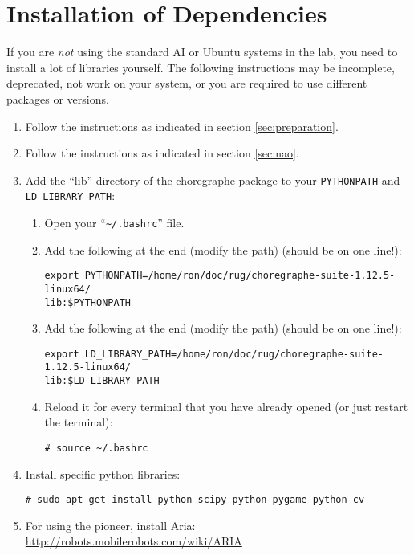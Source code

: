 \documentclass[a4paper, 10pt]{article}
\begin{document}
\section{Installation of Dependencies}

If you are \textit{not} using the standard AI or Ubuntu systems in the lab, you need to install a lot of libraries yourself.
The following instructions may be incomplete, deprecated, not work on your system, or you are required to use different packages or versions.

\begin{enumerate}
    \item Follow the instructions as indicated in section \ref{sec:preparation}.
    \item Follow the instructions as indicated in section \ref{sec:nao}.
    \item Add the ``lib'' directory of the choregraphe package to your \lstinline{PYTHONPATH} and \lstinline{LD_LIBRARY_PATH}:
    \begin{enumerate}
        \item Open your ``\lstinline{~/.bashrc}'' file.
        \item Add the following at the end (modify the path) (should be on one line!):
\begin{lstlisting}
export PYTHONPATH=/home/ron/doc/rug/choregraphe-suite-1.12.5-linux64/
lib:$PYTHONPATH
\end{lstlisting}
        \item Add the following at the end (modify the path) (should be on one line!):
\begin{lstlisting}
export LD_LIBRARY_PATH=/home/ron/doc/rug/choregraphe-suite-1.12.5-linux64/
lib:$LD_LIBRARY_PATH
\end{lstlisting}
        \item Reload it for every terminal that you have already opened (or just restart the terminal):
\begin{lstlisting}
# source ~/.bashrc
\end{lstlisting}
    \end{enumerate}
    \item Install specific python libraries:
\begin{lstlisting}
# sudo apt-get install python-scipy python-pygame python-cv
\end{lstlisting}
    \item For using the pioneer, install Aria: \\
        \url{http://robots.mobilerobots.com/wiki/ARIA}

\end{enumerate}
\end{document}
